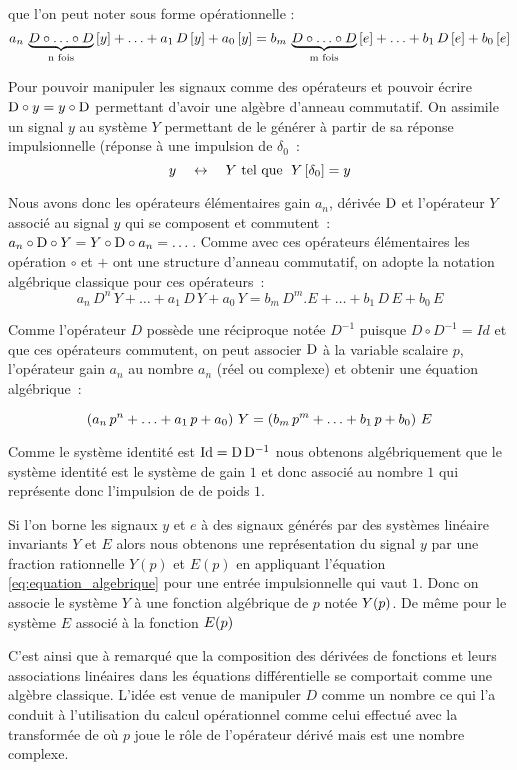 que l'on peut noter sous forme opérationnelle :
$$
a_n\,\underbrace{D\circ\ldots\circ D}_{\text{n fois}}\left[y\right] + \ldots +a_1\,
D\left[y\right] + a_0\left[y\right] = b_m\,\underbrace{D\circ\ldots\circ D}_{\text{m fois}}\left[e\right] + \ldots +b_1\,
D\left[e\right] + b_0\left[e\right]
$$

Pour pouvoir manipuler les signaux comme des opérateurs et pouvoir
écrire $\mathrm{D}\circ y= y\circ\mathrm{D}$ permettant d'avoir une algèbre
d'anneau commutatif. On assimile un signal $y$ au système $Y$
permettant de le générer à partir de sa réponse impulsionnelle
(réponse à une impulsion de \Dirac{} $\delta_0$~:
$$
y \quad\leftrightarrow\quad Y \text{ tel que } \; Y\left[\delta_0\right]=y
$$

Nous avons donc les opérateurs élémentaires gain $a_n$, dérivée $\mathrm{D}$
et l'opérateur $Y$ associé au signal $y$ qui se composent et
commutent~: $a_n\circ\mathrm{D}\circ Y = Y\circ\mathrm{D}\circ a_n =
\dots$. Comme avec ces opérateurs élémentaires les opération $\circ$
et $+$ ont une structure d'anneau commutatif, on adopte la notation
algébrique classique pour ces opérateurs~:
$$
a_n\,D^n\,Y + \ldots +a_1\, D \, Y + a_0 \,Y = b_m\,D^m.E + \ldots +b_1\, D\, E + b_0 \,E
$$

Comme l'opérateur $D$ possède une réciproque notée $D^{-1}$ puisque
$D\circ D^{-1}= Id$ et que ces opérateurs commutent, on peut associer
$\mathrm{D}$ à la variable scalaire $p$, l'opérateur gain $a_n$ au nombre
$a_n$ (réel ou complexe) et obtenir une équation algébrique~:

\begin{equation}
  \left(a_n\,p^n + \ldots +a_1\, p + a_0 \right)\, Y = \left(b_m\,p^m + \ldots +b_1\, p + b_0 \right)\,E
  \label{eq:equation_algebrique_p}
\end{equation}

Comme le système identité est $\mathrm{Id}=\mathrm{D}\,\mathrm{D}^{-1}$ nous obtenons
algébriquement que le système identité est le système de gain $1$ et
donc associé au nombre $1$ qui représente donc l'impulsion de \Dirac{}
de poids $1$.

Si l'on borne les signaux $y$ et $e$ à des signaux générés par des
systèmes linéaire invariants $Y$ et $E$ alors nous obtenons une
représentation du signal $y$ par une fraction rationnelle $Y(p)$ et
$E(p)$ en appliquant l'équation \eqref{eq:equation_algebrique} pour
une entrée impulsionnelle qui vaut $1$. Donc on associe le système $Y$
à une fonction algébrique de $p$ notée $Y\!\left(p\right)$. De même pour le
système $E$ associé à la fonction $E\!\left(p\right)$

C'est ainsi que \Heaviside{} à remarqué que la composition des
dérivées de fonctions et leurs associations linéaires dans les
équations différentielle se comportait comme une algèbre
classique. L'idée est venue de manipuler $D$ comme un nombre ce qui
l'a conduit à l'utilisation du calcul opérationnel comme celui
effectué avec la transformée de \Laplace{} où $p$ joue le rôle de
l'opérateur dérivé mais est une nombre complexe.


